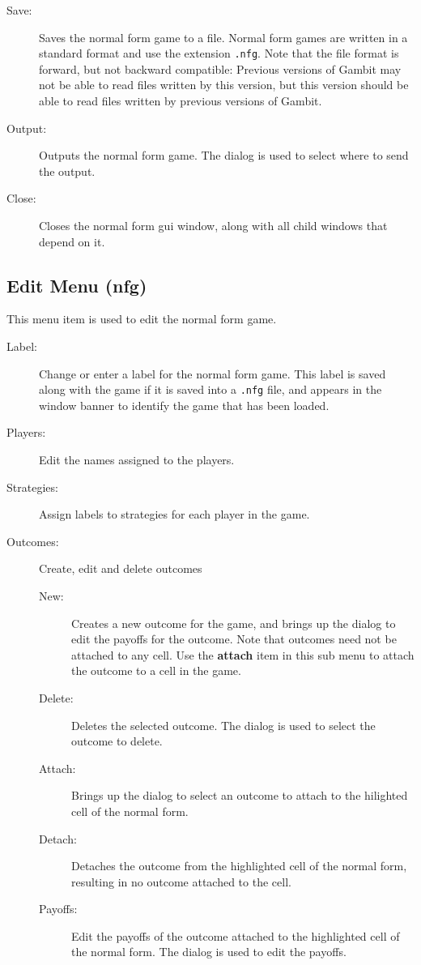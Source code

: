 \documentclass[12pt]{report}
\begin{document}
\begin{description}
\item[Save:] Saves the normal form game to a file.  Normal form games
are written in a standard format and use the extension {\tt .nfg}.
Note that the file format is forward, but not backward compatible:
Previous versions of Gambit may not be able to read files written by
this version, but this version should be able to read files written by
previous versions of Gambit.
\item[Output:] Outputs the normal form game.  The  dialog is used to select where to send the output. 
\item[Close:] Closes the normal form gui window, along with all child windows that depend on it.  
\end{description}

\subsection{Edit Menu (nfg)}\label{nfedit}

This menu item is used to edit the normal form game.  

\begin{description}
\item[Label:] Change or enter a label for the normal form game. This
label is saved along with the game if it is saved into a {\tt .nfg}
file, and appears in the window banner to identify the game that has
been loaded.
\item[Players:] Edit the names assigned to the players. 
\item[Strategies:] Assign labels to strategies for each player in the game.   
\item[Outcomes:] Create, edit and delete outcomes
\begin{description}
\item[New:] Creates a new outcome for the game, and brings up the 
 dialog to edit the payoffs for
the outcome.  Note that outcomes need not be attached to any cell.
Use the {\bf attach} item in this sub menu to attach the outcome to a
cell in the game. 
\item[Delete:] Deletes the selected outcome.  The  dialog is used to select the outcome to
delete.
\item[Attach:] Brings up the  
dialog to select an outcome to attach to the hilighted cell of the
normal form.
\item[Detach:] Detaches the outcome from the highlighted cell of the
normal form, resulting in no outcome attached to the cell. 
\item[Payoffs:] Edit the payoffs of the outcome attached to the
highlighted cell of the normal form. The  dialog is used to edit the payoffs.
\end{description}
\end{description}
\end{document}

